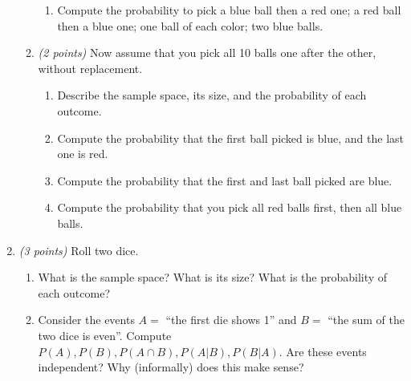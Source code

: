 \documentclass[12pt]{article}
\begin{document}
\begin{enumerate}
\begin{enumerate}
\begin{enumerate}

\item Compute the probability to pick a blue ball then a red one; a red ball then a blue one; one ball of each color; two blue balls. \newline


\end{enumerate}

\item \emph{(2 points)} Now assume that you pick all 10 balls one after the other, without replacement.

\begin{enumerate}
\item Describe the sample space, its size, and the probability of each outcome. \newline

\item Compute the probability that the first ball picked is blue, and the last one is red. \newline

\item Compute the probability that the first and last ball picked are blue. \newline

\item Compute the probability that you pick all red balls first, then all blue balls. \newline

\end{enumerate}
\end{enumerate}

\item \emph{(3 points)} Roll two dice.

\begin{enumerate}
\item What is the sample space? What is its size? What is the probability of each outcome? \newline


\item Consider the events \( A = \) ``the first die shows 1'' and \( B = \) ``the sum of the two dice is even''. Compute \( P(A), P(B), P(A \cap B), P(A | B), P(B | A) \). Are these events independent? Why (informally) does this make sense? \newline


\end{enumerate}
\end{enumerate}
\end{document}
